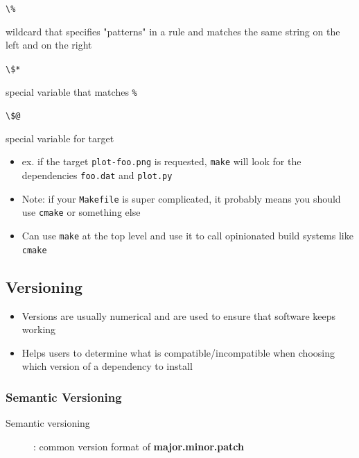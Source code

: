 \documentclass[letterpaper,12pt]{article}
\newcommand*{\lstitem}[1]{
  \setbox0\hbox{\lstinline{#1}}
  \item[\usebox0]
}
\begin{document}
\begin{description}
 \lstitem{\%} wildcard that specifies "patterns" in a rule and matches the same string on the left and on the right
 \lstitem{\$*} special variable that matches \lstinline{%}
 \lstitem{\$@} special variable for target
\end{description}

\begin{itemize}
 \item ex. if the target \lstinline{plot-foo.png} is requested, \lstinline{make} will look for the dependencies \lstinline{foo.dat} and \lstinline{plot.py}
 \item Note: if your \lstinline{Makefile} is super complicated, it probably means you should use \lstinline{cmake} or something else
 \item Can use \lstinline{make} at the top level and use it to call opinionated build systems like \lstinline{cmake}
\end{itemize}

\subsection{Versioning}
\begin{itemize}
 \item Versions are usually numerical and are used to ensure that software keeps working
 \item Helps users to determine what is compatible/incompatible when choosing which version of a dependency to install
\end{itemize}

\subsubsection{Semantic Versioning}

\begin{description}
 \item[Semantic versioning]: common version format of \textbf{major.minor.patch}
\end{description}
\end{document}
